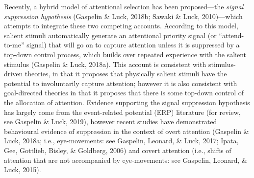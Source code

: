 \documentclass[jou, a4paper, noextraspace,floatsintext]{apa6}
\theoremstyle{definition}
\theoremstyle{definition}
\theoremstyle{definition}
\theoremstyle{remark}
\begin{document}
Recently, a hybrid model of attentional selection has been
proposed---the \emph{signal suppression hypothesis} (Gaspelin \& Luck,
2018b; Sawaki \& Luck, 2010)---which attempts to integrate these two
competing accounts. According to this model, salient stimuli
automatically generate an attentional priority signal (or
\enquote{attend-to-me} signal) that will go on to capture attention
unless it is suppressed by a top-down control process, which builds over
repeated experience with the salient stimulus (Gaspelin \& Luck, 2018a).
This account is consistent with stimulus-driven theories, in that it
proposes that physically salient stimuli have the potential to
involuntarily capture attention; however it is also consistent with
goal-directed theories in that it proposes that there is some top-down
control of the allocation of attention. Evidence supporting the signal
suppression hypothesis has largely come from the event-related potential
(ERP) literature (for review, see Gaspelin \& Luck, 2019), however
recent studies have demonstrated behavioural evidence of suppression in
the context of overt attention (Gaspelin \& Luck, 2018a; i.e.,
eye-movements: see Gaspelin, Leonard, \& Luck, 2017; Ipata, Gee,
Gottlieb, Bisley, \& Goldberg, 2006) and covert attention (i.e., shifts
of attention that are not accompanied by eye-movements: see Gaspelin,
Leonard, \& Luck, 2015).
\end{document}
